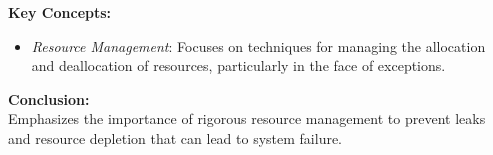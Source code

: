 \vspace{2mm}
\noindent\textbf{Key Concepts:}
\begin{itemize}
  \item \textit{Resource Management}: Focuses on techniques for managing the allocation and deallocation of resources, particularly in the face of exceptions.
\end{itemize}

\vspace{2mm}
\noindent\textbf{Conclusion:} \\
Emphasizes the importance of rigorous resource management to prevent leaks and resource depletion that can lead to system failure.

